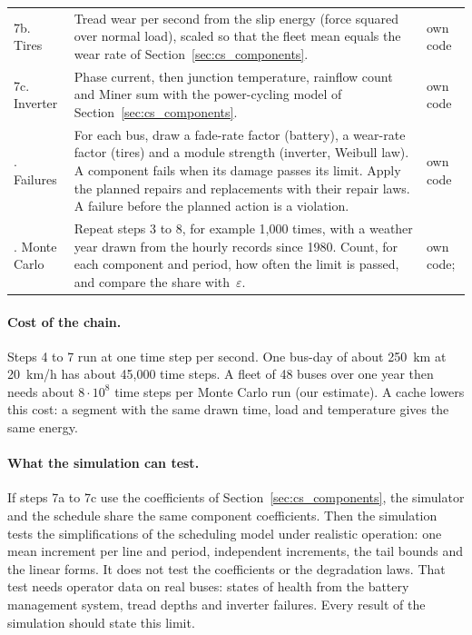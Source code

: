 \documentclass[11pt,a4paper]{article}
\theoremstyle{plain}
\theoremstyle{definition}
\theoremstyle{remark}
\begin{document}
\begin{table}[htbp]
\begin{tabularx}{\linewidth}{@{}>{\hsize=0.523\hsize\raggedright\arraybackslash}X>{\hsize=1.671\hsize\raggedright\arraybackslash}X>{\hsize=0.805\hsize\raggedright\arraybackslash}X@{}}
7b. Tires & Tread wear per second from the slip energy (force squared over normal load), scaled so that the fleet mean equals the wear rate of Section~\ref{sec:cs_components}. & own code \\
7c. Inverter & Phase current, then junction temperature, rainflow count and Miner sum with the power-cycling model of Section~\ref{sec:cs_components}. & own code \\
8. Failures & For each bus, draw a fade-rate factor (battery), a wear-rate factor (tires) and a module strength (inverter, Weibull law). A component fails when its damage passes its limit. Apply the planned repairs and replacements with their repair laws. A failure before the planned action is a violation. & own code \\
9. Monte Carlo & Repeat steps 3 to 8, for example 1,000 times, with a weather year drawn from the hourly records since 1980. Count, for each component and period, how often the limit is passed, and compare the share with~$\varepsilon$. & own code; \cite{MeteoSwissSMN2026} \\
\bottomrule
\end{tabularx}
\end{table}

\paragraph{Cost of the chain.}
Steps 4 to 7 run at one time step per second.
One bus-day of about 250~km at 20~km/h has about 45,000 time steps.
A fleet of 48 buses over one year then needs about $8 \cdot 10^8$ time steps per Monte Carlo run (our estimate).
A cache lowers this cost: a segment with the same drawn time, load and temperature gives the same energy.

\paragraph{What the simulation can test.}
If steps 7a to 7c use the coefficients of Section~\ref{sec:cs_components}, the simulator and the schedule share the same component coefficients.
Then the simulation tests the simplifications of the scheduling model under realistic operation: one mean increment per line and period, independent increments, the tail bounds and the linear forms.
It does not test the coefficients or the degradation laws.
That test needs operator data on real buses: states of health from the battery management system, tread depths and inverter failures.
Every result of the simulation should state this limit.
\end{document}
